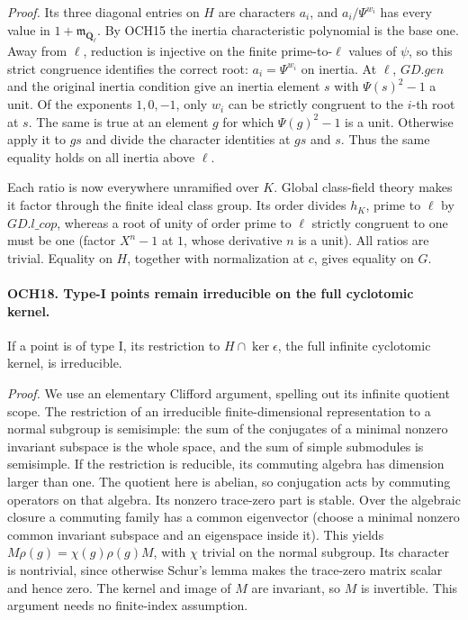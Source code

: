 \emph{Proof.}
Its three diagonal entries on \(H\) are characters \(a_i\),
and \(a_i/\Psi^{w_i}\) has every value in
\(1+\mathfrak m_{\overline{\mathbf Q}_\ell}\).
By OCH15 the inertia characteristic polynomial is the base one.
Away from \(\ell\), reduction is injective on the finite
prime-to-\(\ell\) values of \(\psi\), so this strict
congruence identifies the correct root:
\(a_i=\Psi^{w_i}\) on inertia.  At \(\ell\), \(GD.gen\)
and the original inertia condition give an inertia element \(s\)
with \(\Psi(s)^2-1\) a unit.  Of the exponents \(1,0,-1\),
only \(w_i\) can be strictly congruent to the \(i\)-th root
at \(s\).  The same is true at an element \(g\) for which
\(\Psi(g)^2-1\) is a unit.  Otherwise apply it to \(gs\)
and divide the character identities at \(gs\) and \(s\).
Thus the same equality holds on all inertia above \(\ell\).

Each ratio is now everywhere unramified over \(K\).  Global
class-field theory makes it factor through the finite ideal class
group.  Its order divides \(h_K\), prime to \(\ell\) by
\(GD.l\_cop\), whereas a root of unity of order prime to
\(\ell\) strictly congruent to one must be one (factor
\(X^n-1\) at \(1\), whose derivative \(n\) is a unit).
All ratios are trivial.  Equality on \(H\), together with
normalization at \(c\), gives equality on \(G\).

\paragraph{OCH18. Type-I points remain irreducible on the full cyclotomic kernel.}
\label{claim:OCH18}
If a point is of type I, its restriction to
\(H\cap\ker\epsilon\), the full infinite cyclotomic kernel,
is irreducible.

\emph{Proof.}
We use an elementary Clifford argument, spelling out its infinite
quotient scope.  The restriction of an irreducible finite-dimensional
representation to a normal subgroup is semisimple: the sum of the
conjugates of a minimal nonzero invariant subspace is the whole
space, and the sum of simple submodules is semisimple.  If the
restriction is reducible, its commuting algebra has dimension
larger than one.  The quotient here is abelian, so conjugation
acts by commuting operators on that algebra.  Its nonzero trace-zero
part is stable.  Over the algebraic closure a commuting family has
a common eigenvector (choose a minimal nonzero common invariant
subspace and an eigenspace inside it).  This yields
\(M\rho(g)=\chi(g)\rho(g)M\), with \(\chi\) trivial on
the normal subgroup.  Its character is nontrivial, since otherwise
Schur's lemma makes the trace-zero matrix scalar and hence zero.
The kernel and image of \(M\) are invariant, so \(M\) is
invertible.  This argument needs no finite-index assumption.

